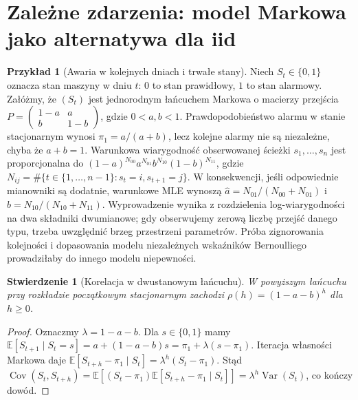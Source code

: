 \documentclass[11pt,a4paper,oneside]{report}
\numberwithin{equation}{chapter}
\theoremstyle{plain}
\newtheorem{stwierdzenie}[twierdzenie]{Stwierdzenie}
\theoremstyle{definition}
\newtheorem{przyklad}{Przykład}[chapter]
\theoremstyle{remark}
\newcommand{\E}{\mathbb E}
\newcommand{\Var}{\operatorname{Var}}
\newcommand{\Cov}{\operatorname{Cov}}
\begin{document}
\section{Zależne zdarzenia: model Markowa jako alternatywa dla iid}
\begin{przyklad}[Awaria w kolejnych dniach i trwałe stany]
Niech $S_t\in\{0,1\}$ oznacza stan maszyny w dniu $t$:
$0$ to stan prawidłowy, $1$ to stan alarmowy. Załóżmy,
że $(S_t)$ jest jednorodnym łańcuchem Markowa o macierzy
przejścia
$P=\begin{pmatrix}1-a&a\\ b&1-b\end{pmatrix}$,
gdzie $0<a,b<1$. Prawdopodobieństwo alarmu w stanie
stacjonarnym wynosi $\pi_1=a/(a+b)$, lecz kolejne
alarmy nie są niezależne, chyba że $a+b=1$.
Warunkowa wiarygodność obserwowanej ścieżki
$s_1,\ldots,s_n$ jest proporcjonalna do
$(1-a)^{N_{00}}a^{N_{01}}b^{N_{10}}(1-b)^{N_{11}}$,
gdzie $N_{ij}=\#\{t\in\{1,\ldots,n-1\}:s_t=i,s_{t+1}=j\}$.
W konsekwencji, jeśli odpowiednie mianowniki są dodatnie,
warunkowe MLE wynoszą
$\widehat a=N_{01}/(N_{00}+N_{01})$ i
$\widehat b=N_{10}/(N_{10}+N_{11})$.
Wyprowadzenie wynika z rozdzielenia log-wiarygodności
na dwa składniki dwumianowe; gdy obserwujemy zerową
liczbę przejść danego typu, trzeba uwzględnić brzeg
przestrzeni parametrów. Próba zignorowania kolejności
i dopasowania modelu niezależnych wskaźników Bernoulliego
prowadziłaby do innego modelu niepewności.
\end{przyklad}

\begin{stwierdzenie}[Korelacja w dwustanowym łańcuchu]
\label{prop:markov-corr}
W powyższym łańcuchu przy rozkładzie początkowym
stacjonarnym zachodzi
$\rho(h)=(1-a-b)^h$ dla $h\ge0$.
\end{stwierdzenie}
\begin{proof}
Oznaczmy $\lambda=1-a-b$.
Dla $s\in\{0,1\}$ mamy
$\E[S_{t+1}\mid S_t=s]=a+(1-a-b)s
=\pi_1+\lambda(s-\pi_1)$.
Iteracja własności Markowa daje
$\E[S_{t+h}-\pi_1\mid S_t]=\lambda^h(S_t-\pi_1)$.
Stąd
$\Cov(S_t,S_{t+h})=
\E[(S_t-\pi_1)\E[S_{t+h}-\pi_1\mid S_t]]
=\lambda^h\Var(S_t)$, co kończy dowód.
\end{proof}
\end{document}
